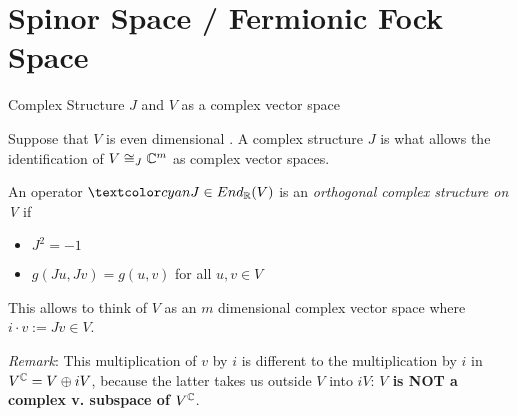 \section{Spinor Space / Fermionic Fock Space}

\begin{frame}{Complex Structure $J$ and $V$ as a complex vector space} %
    
    Suppose that $V$ is even dimensional%
    . A complex structure $J$ is what allows the identification of $V \cong_J \mathbb C^m$ as complex vector spaces.
    
    \begin{definition}
    An operator $\defn{J} \in End_\RR(V)$ is an \emph{orthogonal complex structure on V} if 
        
        \begin{itemize}
            
        \item $J^2 = -1$
        
        \item $g(Ju, Jv) = g(u, v)$ for all $u, v \in V$
            
        \end{itemize}
    \end{definition}
    
    This allows to think of $V$ as an $m$ dimensional complex vector space where $i \cdot v := Jv \in V$.
    
    \emph{Remark}: This multiplication of $v$ by $i$ is different to the multiplication by $i$ in $V^\mathbb C = V \oplus iV$, because the latter takes us outside $V$ into $iV$: \textbf{$V$ is NOT a complex v. subspace of $V^\mathbb C$}.

\end{frame}


